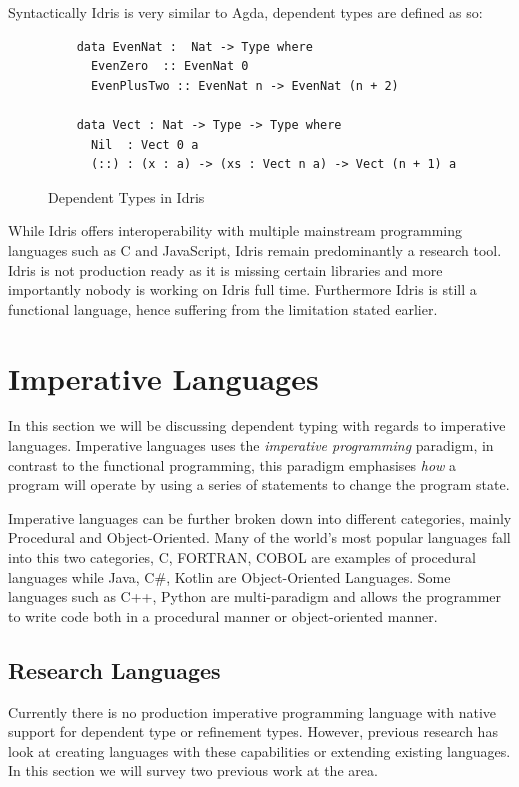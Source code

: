 \documentclass[a4paper,12pt]{report}
\begin{document}
\par
Syntactically Idris is very similar to Agda, dependent types are defined as so: 
\begin{figure}[H]
  \begin{lstlisting}      
    data EvenNat :  Nat -> Type where
      EvenZero  :: EvenNat 0
      EvenPlusTwo :: EvenNat n -> EvenNat (n + 2)
      
    data Vect : Nat -> Type -> Type where
      Nil  : Vect 0 a
      (::) : (x : a) -> (xs : Vect n a) -> Vect (n + 1) a
  \end{lstlisting}
  \caption{Dependent Types in Idris}
\end{figure}

\par
While Idris offers interoperability with multiple mainstream programming 
languages such as C and JavaScript, Idris remain predominantly a research tool. 
Idris is not production ready \cite{gpIdris} as it is missing certain libraries 
and more importantly nobody is working on Idris full time. Furthermore Idris is 
still a functional language, hence suffering from the limitation stated earlier. 

\section{Imperative Languages}

In this section we will be discussing dependent typing with regards to imperative 
languages. Imperative languages uses the \textit{imperative programming} 
\cite{imperativeOverview} paradigm, in contrast to the functional 
programming, this paradigm emphasises \textit{how} a program will operate 
by using a series of statements to change the program state.

\par
Imperative languages can be further broken down into different categories, 
mainly Procedural and Object-Oriented. Many of the world's most popular languages 
fall into this two categories, C, FORTRAN, COBOL are examples of procedural 
languages while Java, C#, Kotlin are Object-Oriented Languages. Some languages such 
as C++, Python are multi-paradigm and allows the programmer to write code both 
in a procedural manner or object-oriented manner. 

\subsection{Research Languages}
Currently there is no production imperative programming language with 
native support for dependent type or refinement types. 
However, previous research has look at creating languages with these 
capabilities or extending existing languages. In this section we will survey 
two previous work at the area. 
\end{document}
